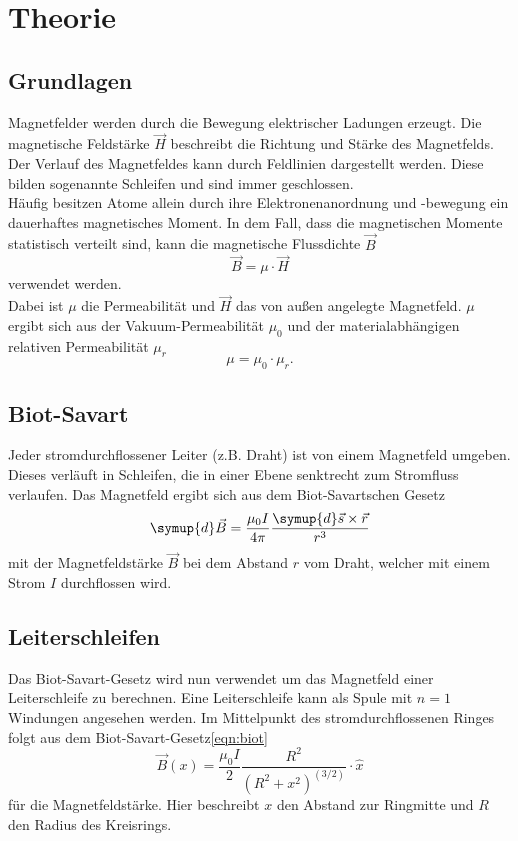 \section{Theorie}
\label{sec:Theorie}

\subsection{Grundlagen}
Magnetfelder werden durch die Bewegung elektrischer Ladungen erzeugt.
Die magnetische Feldstärke $\vec{H}$ beschreibt die Richtung und Stärke des Magnetfelds.
Der Verlauf des Magnetfeldes kann durch Feldlinien dargestellt werden.
Diese bilden sogenannte Schleifen und sind immer geschlossen.\\
Häufig besitzen Atome allein durch ihre Elektronenanordnung und -bewegung ein dauerhaftes magnetisches Moment.
In dem Fall, dass die magnetischen Momente statistisch verteilt sind, kann die magnetische Flussdichte $\vec{B}$
\begin{equation}
    \vec{B} = \mu \cdot \vec{H}
\end{equation}
verwendet werden.\\
Dabei ist $\mu$ die Permeabilität und $\vec{H}$ das von außen angelegte Magnetfeld.
$\mu$ ergibt sich aus der Vakuum-Permeabilität $\mu_0$ und der materialabhängigen relativen Permeabilität $\mu_r$
\begin{equation}
    \mu = \mu_0 \cdot \mu_r .
\end{equation}

\subsection{Biot-Savart}
Jeder stromdurchflossener Leiter (z.B. Draht) ist von einem Magnetfeld umgeben. Dieses verläuft in Schleifen, die in einer Ebene
senktrecht zum Stromfluss verlaufen. Das Magnetfeld ergibt sich aus dem Biot-Savartschen Gesetz
\begin{equation}
    \symup{d}\vec{B} = \frac{\mu_0 I}{4\pi} \frac{\symup{d}\vec{s} \times \vec{r}}{r^3}
    \label{eqn:biot}
\end{equation}
mit der Magnetfeldstärke $\vec{B}$ bei dem Abstand $r$ vom Draht, welcher mit einem Strom $I$ durchflossen wird.

\subsection{Leiterschleifen}
Das Biot-Savart-Gesetz wird nun verwendet um das Magnetfeld einer Leiterschleife zu berechnen. Eine Leiterschleife
kann als Spule mit $n=1$ Windungen angesehen werden. Im Mittelpunkt des stromdurchflossenen Ringes folgt aus dem Biot-Savart-Gesetz\eqref{eqn:biot}
\begin{equation}
    \vec{B}(x) = \frac{\mu_0 I}{2} \frac{R^2}{(R^2+x^2)^(3/2)} \cdot \hat{x}
\end{equation}
für die Magnetfeldstärke. Hier beschreibt $x$ den Abstand zur Ringmitte und $R$ den Radius des Kreisrings.  \\


